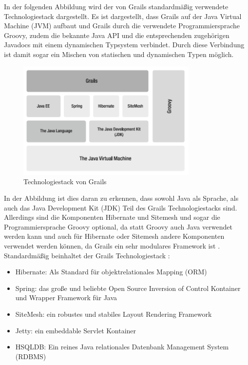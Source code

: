 In der folgenden Abbildung wird der von Grails standardmäßig verwendete Technologiestack dargestellt. Es ist dargestellt, dass Grails auf der Java Virtual Machine (JVM) aufbaut und Grails durch die verwendete Programmiersprache Groovy, zudem die bekannte Java API und die entsprechenden zugehörigen Javadocs mit einem dynamischen Typsystem verbindet. Durch diese Verbindung ist damit sogar ein Mischen von statischen und dynamischen Typen möglich. \citep[S.2-4]{DGG2002} 
\begin{figure}[h]
\centering
\includegraphics[width=0.80\textwidth]{img/Grails-Stack.png}
\caption {Technologiestack von Grails \citep[S.3]{DGG2002}}
\end{figure} 
In der Abbildung ist dies daran zu erkennen, dass sowohl Java als Sprache, als auch das Java Development Kit (JDK) Teil des Grails Technologiestacks sind. Allerdings sind die Komponenten Hibernate und Sitemesh und sogar die Programmiersprache Groovy optional, da statt Groovy auch Java verwendet werden kann und auch für Hibernate oder Sitemesh andere Komponenten verwendet werden können, da Grails ein sehr modulares Framework ist \citep{GP2015}. Standardmäßig beinhaltet der Grails Technologiestack \citep[S.2]{DGG2002}:
\begin{itemize}
\item Hibernate: Als Standard für objektrelationales Mapping (ORM)
\item Spring: das große und beliebte Open Source Inversion of Control Kontainer und Wrapper Framework für Java
\item SiteMesh: ein robustes und stabiles Layout Rendering Framework
\item Jetty: ein embeddable Servlet Kontainer
\item HSQLDB: Ein reines Java relationales Datenbank Management System (RDBMS) 
\end{itemize}